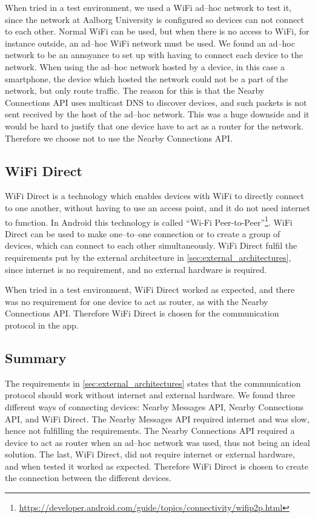 When tried in a test environment, we used a WiFi ad--hoc network to test it,
since the network at Aalborg University is configured so devices can not connect to each other.
Normal WiFi can be used, but when there is no access to WiFi, for instance outside, an ad--hoc WiFi network must be used. 
We found an ad--hoc network to be an annoyance to set up with having to connect each device to the network.
When using the ad--hoc network hosted by a device, in this case a smartphone,
the device which hosted the network could not be a part of the network, but only route traffic.
The reason for this is that the Nearby Connections API uses multicast DNS to discover devices, and such packets is not sent received by the host of the ad--hoc network.
This was a huge downside and it would be hard to justify that one device have to act as a router for the network.
Therefore we choose not to use the Nearby Connections API. 

\subsection{WiFi Direct}
WiFi Direct is a technology which enables devices with WiFi to directly connect to one another,
without having to use an access point, and it do not need internet to function.
In Android this technology is called ``Wi-Fi Peer-to-Peer''\footnote{\url{https://developer.android.com/guide/topics/connectivity/wifip2p.html}}. 
WiFi Direct can be used to make one--to--one connection or to create a group of devices,
which can connect to each other simultaneously.\cite{wifi_direct}
WiFi Direct fulfil the requirements put by the external architecture in \cref{sec:external_architectures},
since internet is no requirement, and no external hardware is required. 

When tried in a test environment, WiFi Direct worked as expected,
and there was no requirement for one device to act as router, as with the Nearby Connections API.
Therefore WiFi Direct is chosen for the communication protocol in the app.

\subsection{Summary}
The requirements in \cref{sec:external_architectures} states that the communication protocol should work without internet and external hardware.
We found three different ways of connecting devices: Nearby Messages API, Nearby Connections API, and WiFi Direct.
The Nearby Messages API required internet and was slow, hence not fulfilling the requirements.
The Nearby Connections API required a device to act as router when an ad--hoc network was used, thus not being an ideal solution.
The last, WiFi Direct, did not require internet or external hardware, and when tested it worked as expected.
Therefore WiFi Direct is chosen to create the connection between the different devices. 
